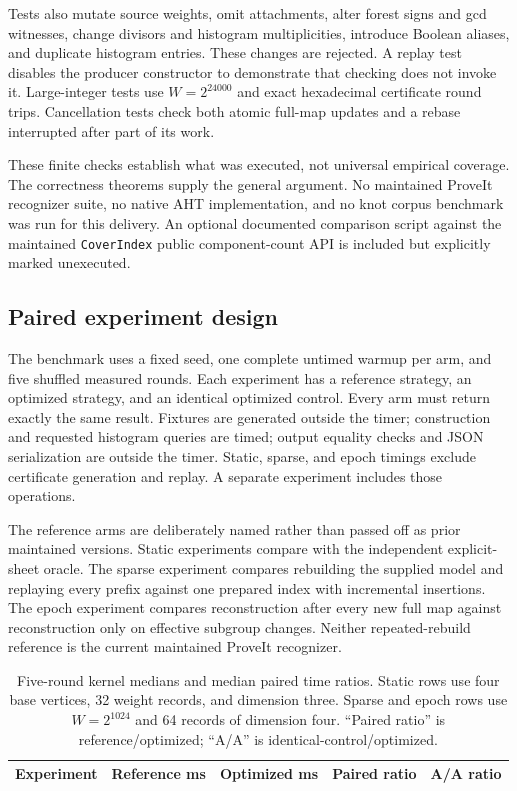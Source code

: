 \documentclass[11pt]{article}
\theoremstyle{definition}
\newcommand{\code}[1]{\texttt{#1}}
\begin{document}
Tests also mutate source weights, omit attachments, alter forest signs and gcd witnesses, change divisors and histogram multiplicities, introduce Boolean aliases, and duplicate histogram entries. These changes are rejected. A replay test disables the producer constructor to demonstrate that checking does not invoke it. Large-integer tests use $W=2^{24000}$ and exact hexadecimal certificate round trips. Cancellation tests check both atomic full-map updates and a rebase interrupted after part of its work.

These finite checks establish what was executed, not universal empirical coverage. The correctness theorems supply the general argument. No maintained ProveIt recognizer suite, no native AHT implementation, and no knot corpus benchmark was run for this delivery. An optional documented comparison script against the maintained \code{CoverIndex} public component-count API is included but explicitly marked unexecuted.

\subsection{Paired experiment design}
The benchmark uses a fixed seed, one complete untimed warmup per arm, and five shuffled measured rounds. Each experiment has a reference strategy, an optimized strategy, and an identical optimized control. Every arm must return exactly the same result. Fixtures are generated outside the timer; construction and requested histogram queries are timed; output equality checks and JSON serialization are outside the timer. Static, sparse, and epoch timings exclude certificate generation and replay. A separate experiment includes those operations.

The reference arms are deliberately named rather than passed off as prior maintained versions. Static experiments compare with the independent explicit-sheet oracle. The sparse experiment compares rebuilding the supplied model and replaying every prefix against one prepared index with incremental insertions. The epoch experiment compares reconstruction after every new full map against reconstruction only on effective subgroup changes. Neither repeated-rebuild reference is the current maintained ProveIt recognizer.

\begin{table}[ht]
\centering\small
\begin{tabular}{lrrrr}
\toprule
Experiment & Reference ms & Optimized ms & Paired ratio & A/A ratio\\
\midrule

\end{tabular}
\caption{Five-round kernel medians and median paired time ratios. Static rows use four base vertices, 32 weight records, and dimension three. Sparse and epoch rows use $W=2^{1024}$ and 64 records of dimension four. ``Paired ratio'' is reference/optimized; ``A/A'' is identical-control/optimized.}
\label{tab:benchmark}
\end{table}
\end{document}
